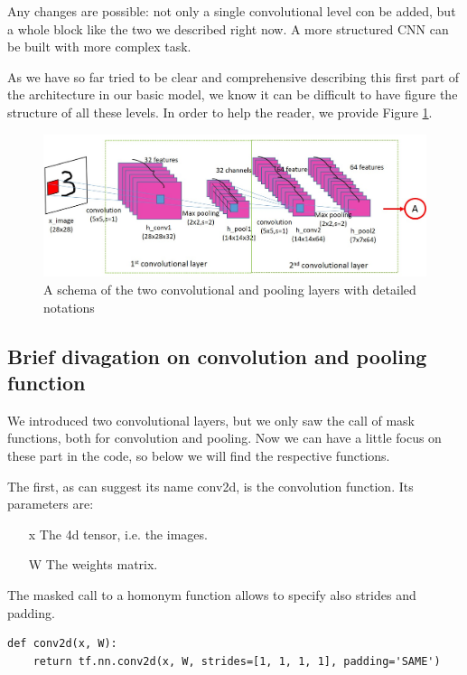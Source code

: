 Any changes are possible: not only a single convolutional level con be added, but a whole block like the two we described right now. A more structured \acs{CNN} can be built with more complex task.

As we have so far tried to be clear and comprehensive describing this first part of the architecture in our basic model, we know it can be difficult to have figure the structure of all these levels. In order to help the reader, we provide Figure \ref{fig:conv_layers}.

\begin{figure}
	\caption{A schema of the two convolutional and pooling layers with detailed notations}
	\label{fig:conv_layers}
	\centering
	\includegraphics[width=1\textwidth]{Images/conv_layers}
\end{figure}

\subsection{Brief divagation on convolution and pooling function}

We introduced two convolutional layers, but we only saw the call of mask functions, both for convolution and pooling. Now we can have a little focus on these part in the code, so below we will find the respective functions.

The first, as can suggest its name conv2d, is the convolution function. Its parameters are:
\begin{itemize}
	\item[x] The 4d tensor, i.e. the images.
	\item[W] The weights matrix.
\end{itemize}

The masked call to a homonym function allows to specify also strides and padding.

\begin{lstlisting}
def conv2d(x, W):
	return tf.nn.conv2d(x, W, strides=[1, 1, 1, 1], padding='SAME')
\end{lstlisting}

